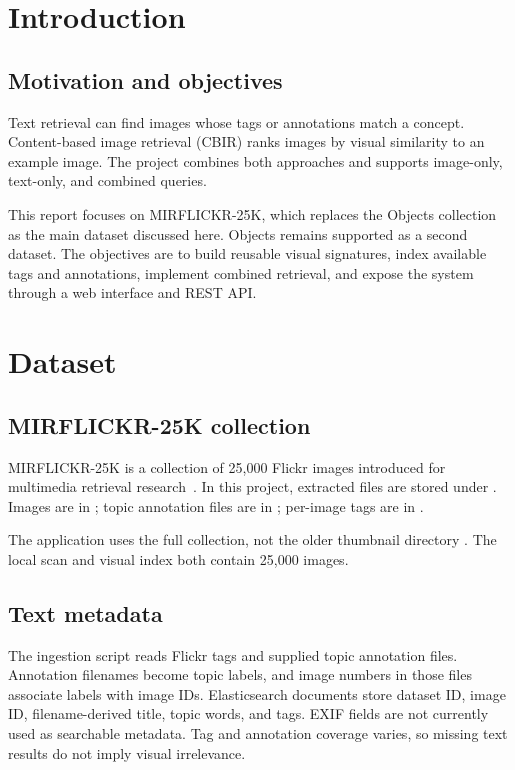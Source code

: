 \documentclass[12pt,a4paper]{article}
\begin{document}
\newpage
\tableofcontents
\newpage

\section{Introduction}
\subsection{Motivation and objectives}
Text retrieval can find images whose tags or annotations match a concept.
Content-based image retrieval (CBIR) ranks images by visual similarity to an
example image. The project combines both approaches and supports image-only,
text-only, and combined queries.

This report focuses on MIRFLICKR-25K, which replaces the Objects collection as
the main dataset discussed here. Objects remains supported as a second dataset.
The objectives are to build reusable visual signatures, index available tags
and annotations, implement combined retrieval, and expose the system through a
web interface and REST API.

\section{Dataset}
\subsection{MIRFLICKR-25K collection}
MIRFLICKR-25K is a collection of 25,000 Flickr images introduced for multimedia
retrieval research~\cite{huiskes2008}. In this project, extracted files are
stored under . Images are in
; topic annotation files are in
; per-image tags are in
.

The application uses the full collection, not the older thumbnail directory
. The local scan and visual index both contain 25,000
images.

\subsection{Text metadata}
The ingestion script reads Flickr tags and supplied topic annotation files.
Annotation filenames become topic labels, and image numbers in those files
associate labels with image IDs. Elasticsearch documents store dataset ID,
image ID, filename-derived title, topic words, and tags. EXIF fields are not
currently used as searchable metadata. Tag and annotation coverage varies, so
missing text results do not imply visual irrelevance.
\end{document}
